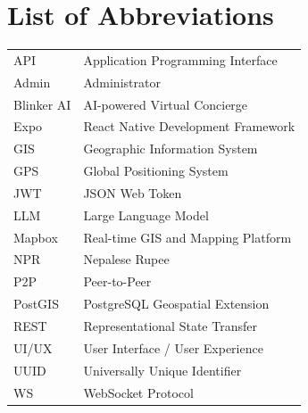 \chapter*{List of Abbreviations}

\noindent
\renewcommand{\arraystretch}{1.8}
\begin{tabular}{lp{10cm}}
API     & Application Programming Interface \\
Admin   & Administrator \\
Blinker AI & AI-powered Virtual Concierge \\
Expo    & React Native Development Framework \\
GIS     & Geographic Information System \\
GPS     & Global Positioning System \\
JWT     & JSON Web Token \\
LLM     & Large Language Model \\
Mapbox  & Real-time GIS and Mapping Platform \\
NPR     & Nepalese Rupee \\
P2P     & Peer-to-Peer \\
PostGIS & PostgreSQL Geospatial Extension \\
REST    & Representational State Transfer \\
UI/UX   & User Interface / User Experience \\
UUID    & Universally Unique Identifier \\
WS      & WebSocket Protocol \\
\end{tabular}
